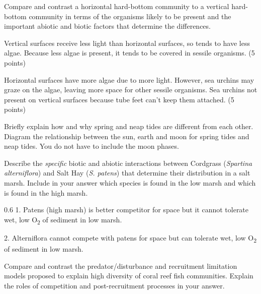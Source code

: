 \newpage



\question[10]
Compare and contrast a horizontal hard-bottom community to a vertical hard-bottom community in terms of the organisms likely to be present and the important abiotic and biotic factors that determine the differences.

	\begin{solution}
	Vertical surfaces receive less light than horizontal surfaces, so tends to have less algae. Because less algae is present, it tends to be covered in sessile organisms. (5 points)

	Horizontal surfaces have more algae due to more light. However, sea urchins may graze on the algae, leaving more space for other sessile organisms. Sea urchins not present on vertical surfaces because tube feet can't keep them attached. (5 points)
	\end{solution}
\newpage


\question[10]
Briefly explain how and why spring and neap tides are different from each other. Diagram the relationship between the sun, earth and moon for spring tides and neap tides. You do not have to include the moon phases.

\question[10]
Describe the \emph{specific} biotic and abiotic interactions between Cordgrass (\textit{Spartina alterniflora}) and Salt Hay (\textit{S. patens}) that determine their distribution in a salt marsh. Include in your answer which species is found in the low marsh and which is found in the high marsh. 

\begin{AnswerPage}{0.6\textheight}%
	1. Patens (high marsh) is better competitor for space but it cannot tolerate wet, low O\textsubscript{2} of sediment in low marsh.
	
	2. Alterniflora cannot compete with patens for space but can tolerate wet, low O\textsubscript{2} of sediment in low marsh.
\end{AnswerPage}


\question[10]
Compare and contrast the predator/disturbance and recruitment limitation models proposed to explain high diversity of coral reef fish communities. Explain the roles of competition and post-recruitment processes in your answer.



